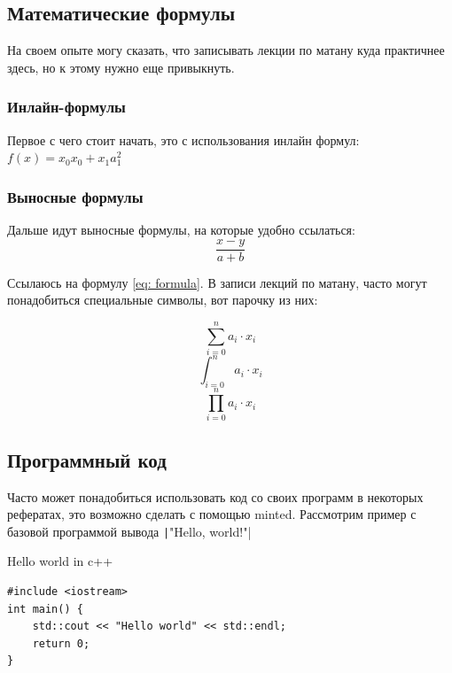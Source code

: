 \subsection{Математические формулы}
На своем опыте могу сказать, что записывать лекции по матану куда практичнее здесь, но к этому нужно еще привыкнуть.

\subsubsection{Инлайн-формулы}
Первое с чего стоит начать, это с использования инлайн формул: $f(x)=x_0 x_0 + x_1 a_1^2$

\subsubsection{Выносные формулы}
Дальше идут выносные формулы, на которые удобно ссылаться: 
\begin{equation}
    \frac{x-y}{a+b}
    \label{eq: formula}
\end{equation}

Ссылаюсь на формулу \ref{eq: formula}.
В записи лекций по матану, часто могут понадобиться специальные символы, вот парочку из них: 


\begin{equation}
    \sum_{i=0}^n a_i \cdot x_i
\end{equation}
\begin{equation}
    \int_{i=0}^n a_i \cdot x_i
\end{equation}
\begin{equation}
    \prod_{i=0}^n a_i \cdot x_i
\end{equation}

\subsection{Программный код}
Часто может понадобиться использовать код со своих программ в некоторых рефератах, это возможно сделать с помощью minted. Рассмотрим пример с базовой программой вывода \texttt|"Hello, world!"|

\begin{listing}[H]
    \caption{Hello world in c++}
    \begin{verbatim}
#include <iostream>
int main() {
    std::cout << "Hello world" << std::endl;
    return 0;
}
    \end{verbatim}
\end{listing}


